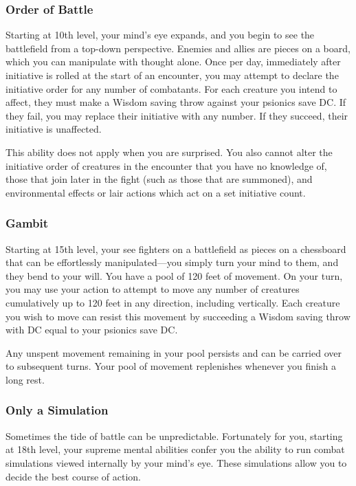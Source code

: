\subsubsection{Order of Battle}
Starting at 10th level,
your mind's eye expands,
and you begin to see the battlefield from a top-down perspective.
Enemies and allies are pieces on a board, which you can manipulate
with thought alone.
Once per day,
immediately after initiative is rolled at the start of an encounter,
you may attempt to declare the initiative order for
any number of combatants.
For each creature you intend to affect,
they must make a Wisdom saving throw against your psionics save DC.
If they fail, you may replace their initiative with any number.
If they succeed, their initiative is unaffected. 

This ability does not apply when you are surprised.
You also cannot alter the initiative order of creatures
in the encounter that you have no knowledge of,
those that join later in the fight (such as those
that are summoned),
and environmental effects or lair actions
which act on a set initiative count.

\subsubsection{Gambit}
Starting at 15th level,
your see fighters on a battlefield as pieces on a chessboard
that can be effortlessly manipulated---you simply turn your
mind to them, and they bend to your will.
You have a pool of 120 feet of movement.
On your turn,
you may use your action to attempt to move any number of creatures
cumulatively up to 120 feet in any direction,
including vertically.
Each creature you wish to move can resist this movement by
succeeding a Wisdom saving throw with DC equal to your
psionics save DC.

Any unspent movement remaining in your pool persists
and can be carried over to subsequent turns.
Your pool of movement replenishes whenever you finish a long rest.

\subsubsection{Only a Simulation}
Sometimes the tide of battle can be unpredictable.
Fortunately for you,
starting at 18th level,
your supreme mental abilities confer you the ability to
run combat simulations viewed internally by your mind's eye.
These simulations allow you to decide the best course of action.


